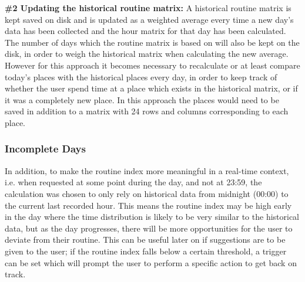 \textbf{\#2 Updating the historical routine matrix:} A historical routine matrix is kept saved on disk and is updated as a weighted average every time a new day's data has been collected and the hour matrix for that day has been calculated. The number of days which the routine matrix is based on will also be kept on the disk, in order to weigh the historical matrix when calculating the new average. However for this approach it becomes necessary to recalculate or at least compare today's places with the historical places every day, in order to keep track of whether the user spend time at a place which exists in the historical matrix, or if it was a completely new place. In this approach the places would need to be saved in addition to a matrix with 24 rows and columns corresponding to each place.

\subsubsection*{Incomplete Days}
In addition, to make the routine index more meaningful in a real-time context, i.e. when requested at some point during the day, and not at 23:59, the calculation was chosen to only rely on historical data from midnight (00:00) to the current last recorded hour. This means the routine index may be high early in the day where the time distribution is likely to be very similar to the historical data, but as the day progresses, there will be more opportunities for the user to deviate from their routine. This can be useful later on if suggestions are to be given to the user; if the routine index falls below a certain threshold, a trigger can be set which will prompt the user to perform a specific action to get back on track.